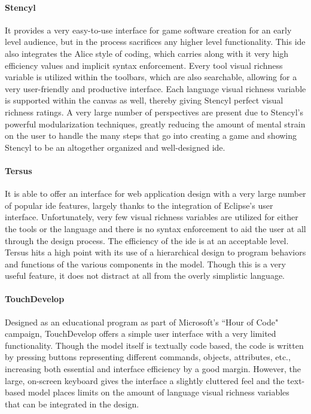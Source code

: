 \paragraph{Stencyl} It provides a very easy-to-use interface for game
software creation for an early level audience, but in the process
sacrifices any higher level functionality. This \ac{ide} also integrates
the Alice style of coding, which carries along with it very high efficiency
values and implicit syntax enforcement. Every tool visual richness variable
is utilized within the toolbars, which are also searchable, allowing for a
very user-friendly and productive interface. Each language visual richness
variable is supported within the canvas as well, thereby giving Stencyl
perfect visual richness ratings. A very large number of perspectives are
present due to Stencyl's powerful modularization techniques, greatly
reducing the amount of mental strain on the user to handle the many steps
that go into creating a game and showing Stencyl to be an altogether
organized and well-designed \ac{ide}.

\paragraph{Tersus} It is able to offer an interface for web application
design with a very large number of popular \ac{ide} features, largely
thanks to the integration of Eclipse's user interface. Unfortunately, very
few visual richness variables are utilized for either the tools or the
language and there is no syntax enforcement to aid the user at all through
the design process. The efficiency of the \ac{ide} is at an acceptable
level. Tersus hits a high point with its use of a hierarchical design to
program behaviors and functions of the various components in the model.
Though this is a very useful feature, it does not distract at all from the
overly simplistic language.

\paragraph{TouchDevelop} Designed as an educational program as part of
Microsoft's ``Hour of Code" campaign, TouchDevelop offers a simple user
interface with a very limited functionality. Though the model itself is
textually code based, the code is written by pressing buttons representing
different commands, objects, attributes, etc., increasing both essential
and interface efficiency by a good margin. However, the large, on-screen
keyboard gives the interface a slightly cluttered feel and the text-based
model places limits on the amount of language visual richness variables
that can be integrated in the design.

